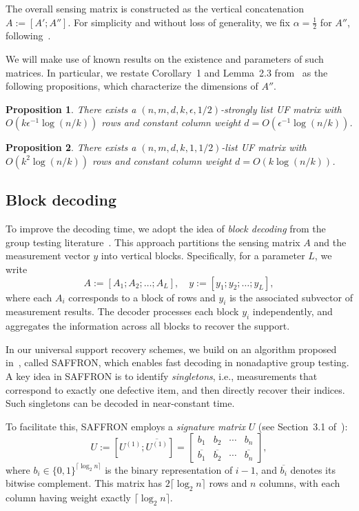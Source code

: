 \documentclass{article}
\newtheorem{proposition}{Proposition}[subsection]
\begin{document}
The overall sensing matrix is constructed as the vertical concatenation
\(
A := [A'; A''].
\)
For simplicity and without loss of generality, we fix $\alpha = \tfrac{1}{2}$ for $A''$, following~\cite{matsumoto2023improved}.

We will make use of known results on the existence and parameters of such matrices. In particular, we restate Corollary~1 and Lemma~2.3 from~\cite{matsumoto2023improved} as the following propositions, which characterize the dimensions of $A''$.

\begin{proposition}\label{lem:suf}
    There exists a $(n,m,d,k,\epsilon,1/2)$-strongly list UF matrix with $O(k\epsilon^{-1}\log(n/k))$ rows and constant column weight $d=O(\epsilon^{-1}\log(n/k))$. 
\end{proposition}
\begin{proposition}\label{lem:uf}
    There exists a $(n,m,d,k,1,1/2)$-list UF matrix with $O(k^2\log(n/k))$ rows and constant column weight $d=O(k\log(n/k))$. 
\end{proposition}

\subsection{Block decoding}\label{sec:bd}
To improve the decoding time, we adopt the idea of \emph{block decoding} from the group testing literature~\cite{cai2017efficient,lee2019saffron,guruswami2023noise}. This approach partitions the sensing matrix $A$ and the measurement vector $y$ into vertical blocks. Specifically, for a parameter $L$, we write
\[
A := [A_1; A_2; \dots; A_L], \quad
y := [y_1; y_2; \dots; y_L],
\]
where each $A_i$ corresponds to a block of rows and $y_i$ is the associated subvector of measurement results. The decoder processes each block $y_i$ independently, and aggregates the information across all blocks to recover the support.

In our universal support recovery schemes, we build on an algorithm  proposed in~\cite{lee2019saffron}, called \textsc{SAFFRON},  which enables fast decoding in nonadaptive group testing. A key idea in \textsc{SAFFRON} is to identify \emph{singletons}, i.e., measurements that correspond to exactly one defective item, and then directly recover their indices. Such singletons can be decoded in near-constant time. 

To facilitate this, \textsc{SAFFRON} employs a \emph{signature matrix} $U$ (see Section~3.1 of~\cite{lee2019saffron}):
\[
U := [U^{(1)}; \overline{U^{(1)}}] =
\begin{bmatrix}
    b_1 & b_2 & \cdots & b_n \\
    \overline{b_1} & \overline{b_2} & \cdots & \overline{b_n}
\end{bmatrix},
\]
where $b_i \in \{0,1\}^{\lceil \log_2 n \rceil}$ is the binary representation of $i-1$, and $\overline{b_i}$ denotes its bitwise complement. This matrix has $2\lceil \log_2 n \rceil$ rows and $n$ columns, with each column having weight exactly $\lceil \log_2 n \rceil$.
\end{document}

